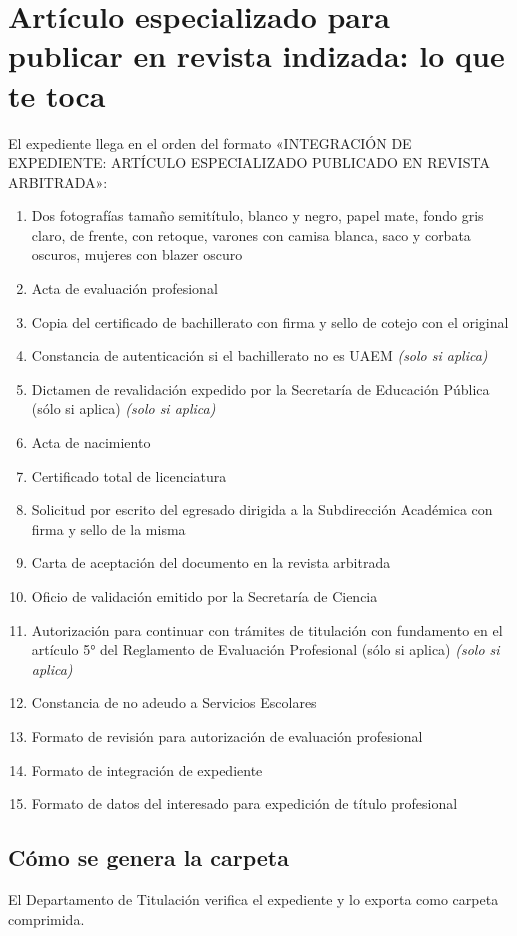 \section{Artículo especializado para publicar en revista indizada: lo que te toca}
El expediente llega en el orden del formato «INTEGRACIÓN DE EXPEDIENTE: ARTÍCULO ESPECIALIZADO PUBLICADO EN REVISTA ARBITRADA»:
\begin{enumerate}
  \item Dos fotografías tamaño semitítulo, blanco y negro, papel mate, fondo gris claro, de frente, con retoque, varones con camisa blanca, saco y corbata oscuros, mujeres con blazer oscuro
  \item Acta de evaluación profesional
  \item Copia del certificado de bachillerato con firma y sello de cotejo con el original
  \item Constancia de autenticación si el bachillerato no es UAEM \emph{(solo si aplica)}
  \item Dictamen de revalidación expedido por la Secretaría de Educación Pública (sólo si aplica) \emph{(solo si aplica)}
  \item Acta de nacimiento
  \item Certificado total de licenciatura
  \item Solicitud por escrito del egresado dirigida a la Subdirección Académica con firma y sello de la misma
  \item Carta de aceptación del documento en la revista arbitrada
  \item Oficio de validación emitido por la Secretaría de Ciencia
  \item Autorización para continuar con trámites de titulación con fundamento en el artículo 5° del Reglamento de Evaluación Profesional (sólo si aplica) \emph{(solo si aplica)}
  \item Constancia de no adeudo a Servicios Escolares
  \item Formato de revisión para autorización de evaluación profesional
  \item Formato de integración de expediente
  \item Formato de datos del interesado para expedición de título profesional
\end{enumerate}
\subsection{Cómo se genera la carpeta}
El Departamento de Titulación verifica el expediente y lo exporta como carpeta comprimida.
